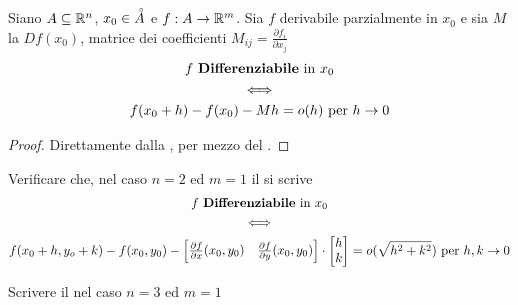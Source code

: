 \begin{corollary}
	\label{coro:f_diff_con_matr_comp}
	Siano $A \subseteq \mathbb{R}^n$, $x_0 \in \accentset{\circ}{A}$ e $f:A \to \mathbb{R}^m$. Sia $f$ derivabile parzialmente in $x_0$ e sia $M$ la $Df(x_0)$, matrice dei coefficienti $M_{ij} = \frac{\partial f_i}{\partial x_j}$
	\begin{equation*}
		\begin{gathered}
			f \text{ \textbf{Differenziabile} in } x_0\\
			\iff\\
			f(x_0 + h) - f(x_0) - Mh = o(h) \text{ per } h \to 0
		\end{gathered}
	\end{equation*}
	\begin{proof}
		Direttamente dalla , per mezzo del .
	\end{proof}
\end{corollary}
\begin{exercise}
	Verificare che, nel caso $n = 2$ ed $m = 1$ il  si scrive
	\begin{equation*}
		\begin{gathered}
			f \text{ \textbf{Differenziabile} in } x_0\\
			\iff\\
			f(x_0 + h, y_o + k) - f(x_0, y_0) -
			\begin{bmatrix}
				\frac{\partial f}{\partial x}(x_0, y_0) & \frac{\partial f}{\partial y}(x_0, y_0)
			\end{bmatrix}
			\cdot
			\begin{bmatrix}
				h\\
				k
			\end{bmatrix}
			= o(\sqrt{h^2 + k^2}) \text{ per } h, k \to 0
		\end{gathered}
	\end{equation*}
\end{exercise}
\begin{exercise}
	Scrivere il  nel caso $n = 3$ ed $m = 1$
\end{exercise}

